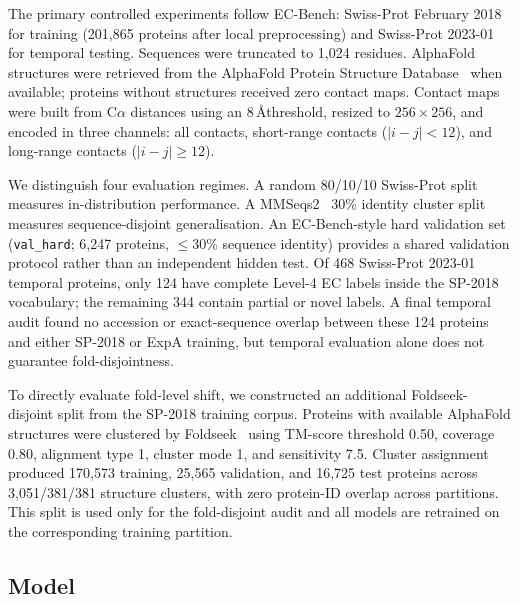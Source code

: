 \documentclass[numbered,contemporary,mediumone]{oup-authoring-template}
\begin{document}
The primary controlled experiments follow EC-Bench: Swiss-Prot February 2018 for
training (201{,}865 proteins after local preprocessing) and Swiss-Prot 2023-01 for
temporal testing. Sequences were truncated to 1{,}024 residues. AlphaFold
structures were retrieved from the AlphaFold Protein Structure Database~\citep{varadi2022} when
available; proteins without structures received zero contact maps. Contact maps
were built from C$\alpha$ distances using an 8\,\AA threshold, resized to
$256\times256$, and encoded in three channels: all contacts, short-range contacts
($|i-j|<12$), and long-range contacts ($|i-j|\geq12$).

We distinguish four evaluation regimes. A random 80/10/10 Swiss-Prot split measures
in-distribution performance. A MMSeqs2~\citep{steinegger2017} 30\% identity cluster split measures
sequence-disjoint generalisation. An EC-Bench-style hard validation set
(\texttt{val\_hard}; 6{,}247 proteins, $\leq$30\% sequence identity) provides a
shared validation protocol rather than an independent hidden test. Of 468
Swiss-Prot 2023-01 temporal proteins, only 124 have complete Level-4 EC labels
inside the SP-2018 vocabulary; the remaining 344 contain partial or novel labels.
A final temporal audit found no accession or exact-sequence overlap between these
124 proteins and either SP-2018 or ExpA training, but temporal evaluation alone
does not guarantee fold-disjointness.

To directly evaluate fold-level shift, we constructed an additional
Foldseek-disjoint split from the SP-2018 training corpus. Proteins with available
AlphaFold structures were clustered by Foldseek~\citep{vankempen2024} using TM-score threshold 0.50,
coverage 0.80, alignment type 1, cluster mode 1, and sensitivity 7.5. Cluster
assignment produced 170{,}573 training, 25{,}565 validation, and 16{,}725 test
proteins across 3{,}051/381/381 structure clusters, with zero protein-ID overlap
across partitions. This split is used only for the fold-disjoint audit and all
models are retrained on the corresponding training partition.

\subsection{Model}
\end{document}
